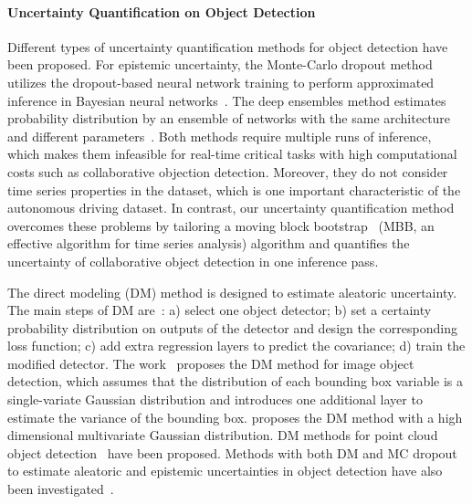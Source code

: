 \paragraph{Uncertainty Quantification on Object Detection} 
Different types of uncertainty quantification methods for object detection have been proposed. For epistemic uncertainty, the Monte-Carlo dropout method utilizes the dropout-based neural network training to perform approximated inference in Bayesian neural networks~\cite{miller2018dropout}. The deep ensembles method estimates probability distribution by an ensemble of networks with the same architecture and different parameters~\cite{lakshminarayanan2017simple,lyu2020probabilistic,ovadia2019can}. Both methods require multiple runs of inference, which makes them infeasible for real-time critical tasks with high computational costs such as collaborative objection detection. Moreover, they do not consider time series properties in the dataset, which is one important characteristic of the autonomous driving dataset. In contrast, our uncertainty quantification method overcomes these problems by tailoring a moving block bootstrap~\cite{lahiri1999theoretical} (MBB, an effective algorithm for time series analysis) algorithm and quantifies the uncertainty of collaborative object detection in one inference pass.

The direct modeling (DM) method is designed to estimate aleatoric uncertainty. The main steps of DM are~\cite{feng2021review}: a) select one object detector; b) set a certainty probability distribution on outputs of the detector and design the corresponding loss function; c) add extra regression layers to predict the covariance; d) train the modified detector. The work~\cite{he2019bounding} proposes the DM method for image object detection, which assumes that the distribution of each bounding box variable is a single-variate Gaussian distribution and introduces one additional layer to estimate the variance of the bounding box. \cite{he2020deep} proposes the DM method with a high dimensional multivariate Gaussian distribution. DM methods for point cloud object detection~\cite{meyer2020learning,meyer2019lasernet} have been proposed. Methods with both DM and MC dropout to estimate aleatoric and epistemic uncertainties in object detection have also been investigated~\cite{kendall2017uncertainties,feng2019leveraging,feng2018towards}. 


